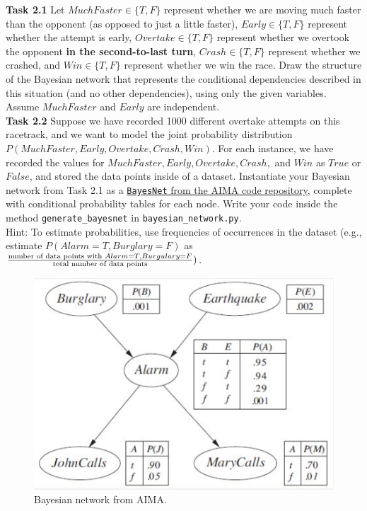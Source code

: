 \documentclass[a4paper]{article}
\theoremstyle{definition}
\theoremstyle{plain}
\begin{document}
\noindent
\textbf{Task 2.1} Let $MuchFaster\in \{T,F\}$ represent whether we are moving much faster than the opponent (as opposed to just a little faster), $Early\in \{T,F\}$ represent whether the attempt is early, $Overtake\in \{T,F\}$ represent whether we overtook the opponent \textbf{in the second-to-last turn}, $Crash\in \{T,F\}$ represent whether we crashed, and $Win\in \{T,F\}$ represent whether we win the race. Draw the structure of the Bayesian network that represents the conditional dependencies described in this situation (and no other dependencies), using only the given variables. Assume $MuchFaster$ and $Early$ are independent.\\

\noindent
\textbf{Task 2.2} Suppose we have recorded 1000 different overtake attempts on this racetrack, and we want to model the joint probability distribution $P(MuchFaster,Early,Overtake,Crash,Win)$. For each instance, we have recorded the values for $MuchFaster,Early,Overtake,Crash,$ and $Win$ as $True$ or $False$, and stored the data points inside of a dataset. Instantiate your Bayesian network from Task 2.1 as a \href{https://github.com/aimacode/aima-python/blob/master/probability.py#L164}{\texttt{BayesNet} from the AIMA code repository}, complete with conditional probability tables for each node. Write your code inside the method \texttt{generate\_bayesnet} in \texttt{bayesian\_network.py}.\\

\noindent
Hint: To estimate probabilities, use frequencies of occurrences in the dataset (e.g., estimate $P(Alarm=T,Burglary=F)$ as $\frac{\textnormal{number of data points with } Alarm=T,Burgulary=F}{\textnormal{total number of data points}})$.\\

\begin{figure}[b!]
    \centering
    \includegraphics[scale=0.47]{images/bayesnet.png}
    \caption{Bayesian network from AIMA.}
    \label{fig:burglary}
\end{figure}
\end{document}
